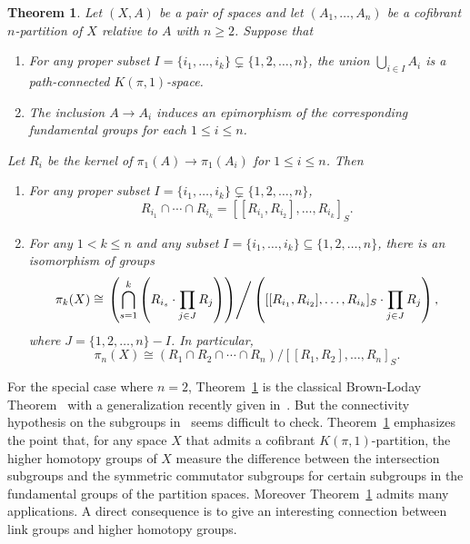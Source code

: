 \documentclass[10pt]{amsart}
\newtheorem{thm}{Theorem}[section]
\numberwithin{equation}{section}
\begin{document}
\begin{thm}\label{theorem1.3}
Let $(X,A)$ be a pair of spaces and let $(A_1,\ldots,A_n)$ be a cofibrant $n$-partition of $X$ relative to $A$ with $n\geq 2$. Suppose that
\begin{enumerate}
\item[i)] For any proper subset $I=\{i_1,\ldots,i_k\}\subsetneq \{1,2,\ldots,n\}$, the union
$
\bigcup_{i\in I}A_i
$
is a path-connected $K(\pi,1)$-space.
\item[ii)] The inclusion $A \to A_i$ induces an epimorphism of the corresponding fundamental groups for each $1\leq i\leq n$.
\end{enumerate}
Let $R_i$ be the kernel of $\pi_1(A)\to \pi_1(A_i)$ for $1\leq i\leq n$. Then
\begin{enumerate}
\item For any proper subset $I=\{i_1,\ldots,i_k\}\subsetneq \{1,2,\ldots,n\}$,
$$
R_{i_1}\cap\cdots\cap R_{i_k}=[[R_{i_1}, R_{i_2}],\ldots,R_{i_k}]_S.
$$
\item For any $1<k\leq n$ and any subset $I=\{i_1,\ldots,i_k\}\subseteq \{1,2,\ldots,n\}$, there is an isomorphism of groups
$$
\pi_k(X)\cong \left.\left(\bigcap_{s=1}^k\left(R_{i_s}\cdot \prod_{j\in J}R_j\right)\right)\right/\left([[R_{i_1}, R_{i_2}],\ldots,R_{i_k}]_S\cdot \prod_{j\in J}R_j \right),
$$
where $J= \{1,2,\ldots,n\}-I$.
In particular, $$\pi_n(X)\cong (R_1\cap R_2\cap \cdots\cap R_n)/[[R_1,R_2],\ldots,R_n]_S.$$
\end{enumerate}
\end{thm}

 For the special case where $n=2$, Theorem~\ref{theorem1.3} is the classical Brown-Loday Theorem~\cite[Corollary 3.4]{BL} with a generalization recently given in~\cite{EM}. But the connectivity hypothesis on the subgroups in~\cite{EM} seems difficult to check. Theorem~\ref{theorem1.3} emphasizes the point that, for any space $X$ that admits a cofibrant $K(\pi,1)$-partition, the higher homotopy groups of $X$ measure the difference between the intersection subgroups and the symmetric commutator subgroups for certain subgroups in the fundamental groups of the partition spaces. Moreover Theorem~\ref{theorem1.3} admits many applications. A direct consequence is to give an interesting connection between link groups and higher homotopy groups.
\end{document}
